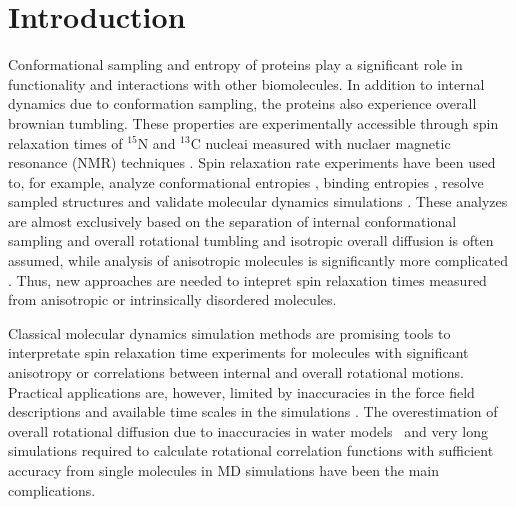 \documentclass[pre,aps,floatfix,authordate1-4,twocolumn]{revtex4-1}
\begin{document}
\section{Introduction}
Conformational sampling and entropy of proteins
play a significant role in functionality
and interactions with other biomolecules.
In addition to internal dynamics due to conformation sampling, the
proteins also experience overall brownian tumbling.
These properties are experimentally accessible through 
spin relaxation times of $^{15}$N and $^{13}$C nucleai measured
with nuclaer magnetic resonance (NMR) 
techniques \cite{jarymowycz06,korzhnev01,bedem15,lewandowski15,lamley15}. 
Spin relaxation rate experiments have been used to, for example, analyze
conformational entropies \cite{kasinath13,allner15,jarymowycz06}, binding entropies \cite{akke93,jarymowycz06},
resolve sampled structures \cite{bedem15}
and validate molecular dynamics simulations \cite{best04,showalter07a,showalter07b,maragakis08,trbovic08}.
These analyzes are almost exclusively based on the
separation of internal conformational sampling 
and overall rotational tumbling \cite{wennerstrom79,Lipari82} and
isotropic overall diffusion is often assumed, while
analysis of anisotropic molecules is significantly more
complicated \cite{jarymowycz06,korzhnev01,luginbuhl97,hall04}.
Thus, new approaches are needed to intepret spin relaxation times
measured from anisotropic or intrinsically disordered molecules.


%

 
Classical molecular dynamics simulation methods are
promising tools to interpretate spin relaxation time experiments
for molecules with significant anisotropy or correlations between
internal and overall rotational motions. Practical applications
are, however, limited by inaccuracies in the force field descriptions
and available time scales in the simulations \cite{prompers02,maragakis08,trbovic08,wong08,anderson12}.
The overestimation of overall rotational diffusion due to inaccuracies in 
water models~\cite{wong08} and very long simulations required to calculate rotational
correlation functions with sufficient accuracy from single molecules in MD
simulations \cite{lu06,anderson12} have been the main complications.
\end{document}
